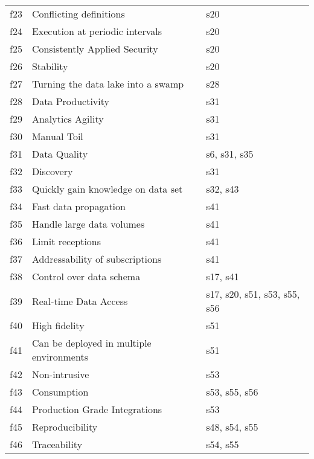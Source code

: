 \begin{tabular}{|c|p{}|p{}|}
f23 & Conflicting definitions & \cellcolor{emerald_shape_1} {s20}\\
f24 & Execution at periodic intervals & \cellcolor{emerald_shape_1} {s20}\\
f25 & Consistently Applied Security & \cellcolor{emerald_shape_1} {s20}\\
f26 & Stability & \cellcolor{emerald_shape_1} {s20}\\
f27 & Turning the data lake into a swamp & \cellcolor{emerald_shape_1} {s28}\\
f28 & Data Productivity & \cellcolor{emerald_shape_1} {s31}\\
f29 & Analytics Agility & \cellcolor{emerald_shape_1} {s31}\\
f30 & Manual Toil & \cellcolor{emerald_shape_1} {s31}\\
f31 & Data Quality & \cellcolor{emerald_shape_1} {s6, s31, s35}\\
f32 & Discovery & \cellcolor{emerald_shape_1} {s31}\\
f33 & Quickly gain knowledge on data set & \cellcolor{emerald_shape_1} {s32, s43}\\
f34 & Fast data propagation & \cellcolor{emerald_shape_1} {s41}\\
f35 & Handle large data volumes & \cellcolor{emerald_shape_1} {s41}\\
f36 & Limit receptions & \cellcolor{emerald_shape_1} {s41}\\
f37 & Addressability of subscriptions & \cellcolor{emerald_shape_1} {s41}\\
f38 & Control over data schema & \cellcolor{emerald_shape_1} {s17, s41}\\
f39 & Real-time Data Access & \cellcolor{emerald_shape_2} {s17, s20, s51, s53, s55, s56}\\
f40 & High fidelity & \cellcolor{emerald_shape_1} {s51}\\
f41 & Can be deployed in multiple environments & \cellcolor{emerald_shape_1} {s51}\\
f42 & Non-intrusive & \cellcolor{emerald_shape_1} {s53}\\
f43 & Consumption & \cellcolor{emerald_shape_1} {s53, s55, s56}\\
f44 & Production Grade Integrations & \cellcolor{emerald_shape_1} {s53}\\
f45 & Reproducibility & \cellcolor{emerald_shape_1} {s48, s54, s55}\\
f46 & Traceability & \cellcolor{emerald_shape_1} {s54, s55}\\

\end{tabular}
